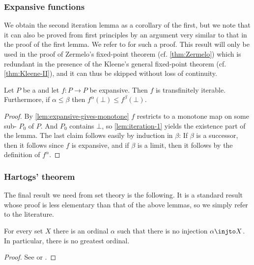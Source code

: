 \subsubsection{Expansive functions}

We obtain the second iteration lemma as a corollary of the first, but we note that it can also be proved from first principles by an argument very similar to that in the proof of the first lemma. We refer to \textcite[Lemma~7.25]{moschovakis-set-theory} for such a proof. This result will only be used in the proof of Zermelo's fixed-point theorem (cf. \cref{thm:Zermelo}) which is redundant in the presence of the Kleene's general fixed-point theorem (cf. \cref{thm:Kleene-II}), and it can thus be skipped without loss of continuity.

\begin{lemma}[Iteration II]
    \label{lem:iteration-2}
    Let $P$ be a \cCPPO{} and let $f \colon P \to P$ be expansive. Then $f$ is transfinitely iterable. Furthermore, if $\alpha \leq \beta$ then $f^\alpha(\bot) \leq f^\beta(\bot)$.
\end{lemma}

\begin{proof}
    By \cref{lem:expansive-gives-monotone} $f$ restricts to a monotone map on some sub-\cCPPO{} $P_0$ of $P$. And $P_0$ contains $\bot$, so \cref{lem:iteration-1} yields the existence part of the lemma. The last claim follows easily by induction in $\beta$: If $\beta$ is a successor, then it follows since $f$ is expansive, and if $\beta$ is a limit, then it follows by the definition of $f^\alpha$.
\end{proof}


\subsubsection{Hartogs' theorem}

The final result we need from set theory is the following. It is a standard result whose proof is less elementary than that of the above lemmas, so we simply refer to the literature.

\begin{theorem} %
    \label{thm:Hartogs}
    For every set $X$ there is an ordinal $\alpha$ such that there is no injection $\alpha \injto X$. In particular, there is no greatest ordinal.
\end{theorem}

\begin{proof}
    See \textcite[Theorem~7.34 and Exercise~12.13]{moschovakis-set-theory} or \textcite[Theorem~8.18]{goldrei-set-theory}.
\end{proof}


